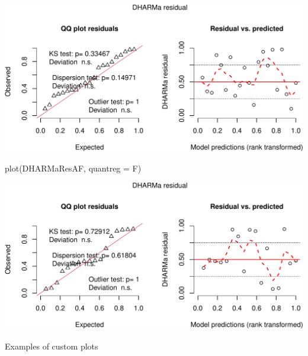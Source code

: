 \documentclass[
]{book}
\newenvironment{Shaded}{\begin{snugshade}}{\end{snugshade}}
\newcommand{\AttributeTok}[1]{\textcolor[rgb]{0.77,0.63,0.00}{#1}}
\newcommand{\FunctionTok}[1]{\textcolor[rgb]{0.00,0.00,0.00}{#1}}
\newcommand{\NormalTok}[1]{#1}
\begin{document}
\includegraphics{_main_files/figure-latex/ppp-1.pdf}

\begin{Shaded}
\begin{Highlighting}[]
\FunctionTok{plot}\NormalTok{(DHARMaResAF, }\AttributeTok{quantreg =}\NormalTok{ F)}
\end{Highlighting}
\end{Shaded}

\includegraphics{_main_files/figure-latex/ppp-2.pdf}

Examples of custom plots
\end{document}
